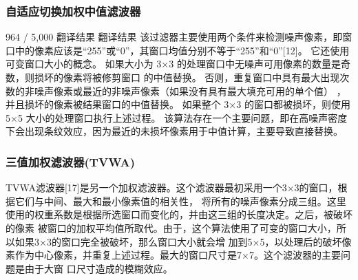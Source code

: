 \documentclass{article} %
\begin{document}
\subsubsection{自适应切换加权中值滤波器}
964 / 5,000
翻译结果
翻译结果
该过滤器主要使用两个条件来检测噪声像素，即窗口中的像素应该是“255”或“0”，其窗口均值分别不等于“255”和“0”[12]。
 它还使用可变窗口大小的概念。 如果大小为 3×3 的处理窗口中无噪声可用像素的数量是奇数，则损坏的像素将被修剪窗口
 的中值替换。 否则，重复窗口中具有最大出现次数的非噪声像素或最近的非噪声像素（如果没有具有最大填充可用的单个值）
 ，并且损坏的像素被结果窗口的中值替换。 如果整个 3×3 的窗口都被损坏，则使用 5×5 大小的处理窗口执行上述过程。 
 该算法存在一个主要问题，即在高噪声密度下会出现条纹效应，因为最近的未损坏像素用于中值计算，主要导致直接替换。

 \subsubsection{三值加权滤波器(TVWA)}
 TVWA滤波器[17]是另一个加权滤波器。这个滤波器最初采用一个3×3的窗口，根据它们与中间、最大和最小像素值的相关性，
 将所有的噪声像素分成三组。这里使用的权重系数是根据所选窗口而变化的，并由这三组的长度决定。之后，被破坏的像素
 被窗口的加权平均值所取代。由于，这个算法使用了可变的窗口大小，所以如果3×3的窗口完全被破坏，那么窗口大小就会增
 加到5×5，以处理后的破坏像素作为中心像素，并重复上述过程。最大的窗口尺寸是7×7。这个滤波器的主要问题是由于大窗
 口尺寸造成的模糊效应。
\end{document}
